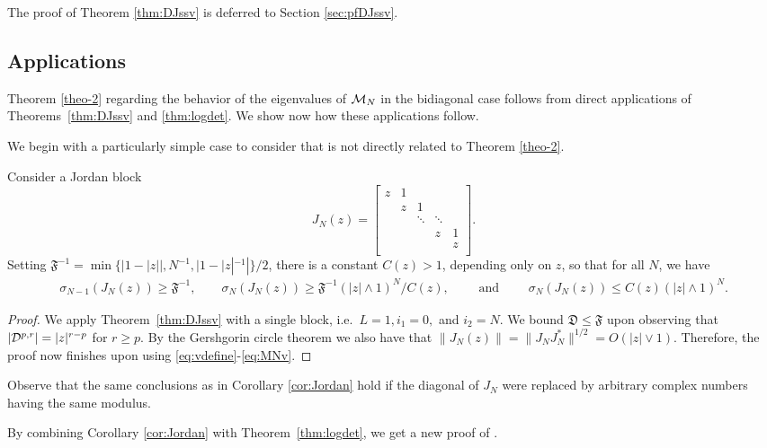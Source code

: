 \documentclass{amsart}
\numberwithin{equation}{section}
\def\corAB{}
\def\corABa{}
\def\corOZ{}
\def\corABrev{\textcolor{black}}
\begin{document}
\corAB{The proof of Theorem \ref{thm:DJssv} is deferred to Section \ref{sec:pfDJssv}.}

\subsection{Applications}
Theorem \ref{theo-2} regarding the behavior of the eigenvalues of $\mathcal{M}_N$
in the bidiagonal case
follows from direct applications of Theorems~\ref{thm:DJssv} and
\ref{thm:logdet}.  We show now how these applications follow.

We begin with a particularly simple case to consider that is not directly related to Theorem \ref{theo-2}.
\begin{corollary}
\label{cor:Jordan}
 Consider a Jordan block
  \[
    J_N(z)=
        \begin{bmatrix}
                z  & 1 &   &   &    \\
                   & z & 1 &   &    \\
                   &   &\ddots & \ddots  &   \\
                   &   &   & z & 1  \\
                   &   &   &   & z  \\
        \end{bmatrix}.
\]
Setting $\mathfrak{F}^{-1} = \min\{|1-|z||, N^{-1}, |1-|z|^{-1}|\}/2$, there is a constant \corAB{$C(z)>1$, depending only on $z$,} so that for all $N$, \corAB{we have}
\begin{align*}
  \sigma_{N-1}(J_N(z)) \geq \mathfrak{F}^{-1}, \qquad \sigma_{N}(J_N(z)) \geq  \mathfrak{F}^{-1}(|z| \wedge 1)^N/C(z), \qquad \text{ and } \qquad \sigma_{N}(J_N(z)) \leq C(z) (|z|\wedge 1)^N.
\end{align*}
\end{corollary}
\begin{proof}
  We apply Theorem~\ref{thm:DJssv} with a single block, i.e.~$L=1, i_1=0,$ and $i_2 = N.$  We bound $\mathfrak{D} \leq \mathfrak{F}$ upon observing that $\corABrev{|\mathcal{D}^{p,r}| = |z|^{r-p}}$ for $r\geq p$. \corAB{By}
  \corOZ{the} \corAB{Gershgorin circle theorem we also have that \corABa{$\|J_N(z)\| =\|J_N J_N^*\|^{1/2} = O( |z|\vee 1)$}. Therefore, the proof now finishes upon using \eqref{eq:vdefine}-\eqref{eq:MNv}}.
  \end{proof}


\begin{remark} Observe that the same conclusions as in
Corollary \ref{cor:Jordan}
  hold if the diagonal of $J_N$ were
  replaced by arbitrary complex numbers having the same modulus.
\end{remark}
\begin{remark} By combining
Corollary \ref{cor:Jordan}
  with Theorem~\ref{thm:logdet}, we get a
  new proof of \cite[Theorem 1.4]{FPZ}. \end{remark}
\end{document}
